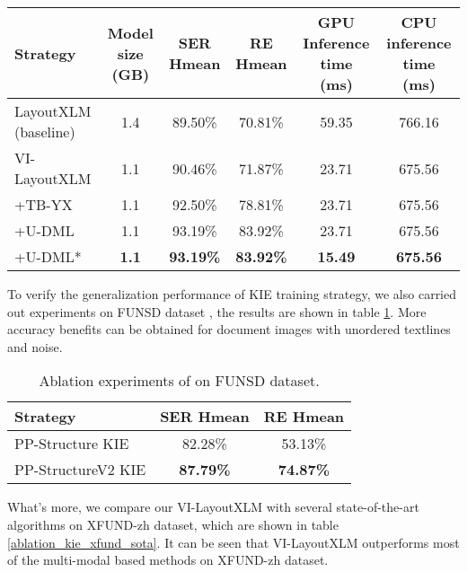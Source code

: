 \documentclass[letterpaper]{article} \usepackage{aaai21}  \usepackage{times}  \usepackage{helvet} \usepackage{courier}  \usepackage[hyphens]{url}  \usepackage{graphicx} \usepackage{algorithm}
\begin{document}
\begin{table*}[h]
\begin{center}
\begin{tabular}{l|c|c|c|c|c}
\hline
Strategy & Model size (GB) & SER Hmean & RE Hmean & GPU Inference time (ms) & CPU inference time (ms) \\
\hline
LayoutXLM (baseline) & 1.4 & 89.50\% & 70.81\% & 59.35 & 766.16 \\
VI-LayoutXLM & 1.1 & 90.46\% & 71.87\% & 23.71 & 675.56 \\
+TB-YX & 1.1 & 92.50\% & 78.81\% & 23.71 & 675.56 \\
+U-DML & 1.1 & 93.19\% & 83.92\% & 23.71 & 675.56 \\
+U-DML* & \textbf{1.1} & \textbf{93.19\%} & \textbf{83.92\%} & \textbf{15.49} & \textbf{675.56} \\
\hline
\end{tabular}
\end{center}
\caption{Ablation experiments of on XFUND-zh dataset. Here * means inference using TensorRT.}
\label{ablation_kie_xfund}
\end{table*}

To verify the generalization performance of KIE training strategy, we also carried out experiments on FUNSD dataset \cite{funsd_dataset}, the results are shown in table \ref{ablation_kie_funsd}. More accuracy benefits can be obtained for document images with unordered textlines and noise.

\begin{table}[H]
\begin{center}
\begin{tabular}{l|c|c}
\hline
Strategy & SER Hmean & RE Hmean \\
\hline
PP-Structure KIE & 82.28\% & 53.13\% \\
PP-StructureV2 KIE & \textbf{87.79\%} & \textbf{74.87\%} \\
\hline
\end{tabular}
\end{center}
\caption{Ablation experiments of on FUNSD dataset.}
\label{ablation_kie_funsd}
\end{table}

What's more, we compare our VI-LayoutXLM with several state-of-the-art algorithms on XFUND-zh dataset, which are shown in table \ref{ablation_kie_xfund_sota}. It can be seen that VI-LayoutXLM outperforms most of the multi-modal based methods on XFUND-zh dataset.
\end{document}
